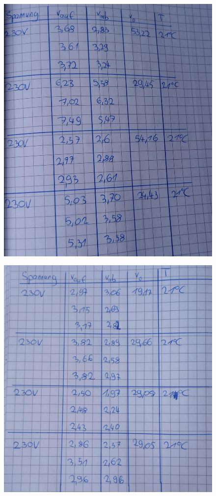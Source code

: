 \begin{figure}[H]
    \centering
    \includegraphics[width=\textwidth]{Bilder/V503.4.jpeg}
\end{figure}

\begin{figure}[H]
    \centering
    \includegraphics[width=\textwidth]{Bilder/V503.5.jpeg}
\end{figure}

